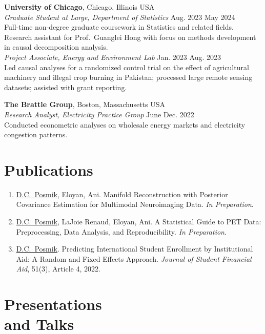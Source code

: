 \documentclass[margin,line]{res}
\begin{document}
\begin{resume}
\textbf{University of Chicago}, Chicago, Illinois USA \\[1mm]
\textit{Graduate Student at Large, Department of Statistics} \hfill Aug. 2023{ \textemdash } May 2024 \\
Full-time non-degree graduate coursework in Statistics and related fields. Research assistant for Prof.\ Guanglei Hong with focus on methods development in causal decomposition analysis. \\[1mm] 
\textit{Project Associate, Energy and Environment Lab} \hfill Jan. 2023{ \textemdash } Aug. 2023 \\
Led causal analyses for a randomized control trial on the effect of agricultural machinery and illegal crop burning in Pakistan; processed large remote sensing datasets; assisted with grant reporting.

\textbf{The Brattle Group}, Boston, Massachusetts USA\\[1mm]
\textit{Research Analyst, Electricity Practice Group} \hfill June{ \textemdash } Dec. 2022 \\
Conducted econometric analyses on wholesale energy markets and electricity congestion patterns.

\section{\sc Publications}

\begin{enumerate}[leftmargin=0pt, labelsep=0.5em, topsep=0pt, partopsep=0pt, itemsep=2pt]
    \item \underline{D.C.\ Posmik}, Eloyan, Ani. Manifold Reconstruction with Posterior Covariance Estimation for Multimodal Neuroimaging Data. \emph{In Preparation}.
    \item \underline{D.C.\ Posmik}, LaJoie Renaud, Eloyan, Ani. A Statistical Guide to PET Data: Preprocessing, Data Analysis, and Reproducibility. \emph{In Preparation}.
    \item \underline{D.C.\ Posmik}. Predicting International Student Enrollment by Institutional Aid: A Random and Fixed Effects Approach. \emph{Journal of Student Financial Aid}, 51(3), Article 4, 2022.
\end{enumerate}

\section{\sc Presentations \\ and Talks}


\end{resume}
\end{document}
